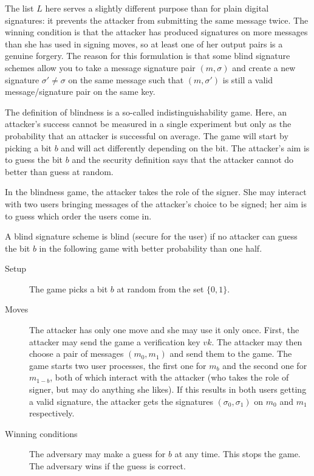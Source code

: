 \documentclass{llncs}
\begin{document}
The list $L$ here serves a slightly different purpose than for plain digital
signatures: it prevents the attacker from submitting the same message twice. The
winning condition is that the attacker has produced signatures on more messages
than she has used in signing moves, so at least one of her output pairs is a
genuine forgery. The reason for this formulation is that some blind signature
schemes allow you to take a message signature pair $(m, \sigma)$ and create a
new signature $\sigma' \neq \sigma$ on the same message such that $(m, \sigma')$
is still a valid message/signature pair on the same key.

The definition of blindness is a so-called indistinguishability game. Here, an
attacker's success cannot be measured in a single experiment but only as the
probability that an attacker is successful on average. The game will start by
picking a bit $b$ and will act differently depending on the bit. The attacker's
aim is to guess the bit $b$ and the security definition says that the attacker
cannot do better than guess at random.

In the blindness game, the attacker takes the role of the signer. She may
interact with two users bringing messages of the attacker's choice to be signed;
her aim is to guess which order the users come in.

\begin{definition}
A blind signature scheme is blind (secure for the user) if no attacker can guess
the bit $b$ in the following game with better probability than one half.

\begin{description}
\item[Setup]
The game picks a bit $b$ at random from the set $\{0, 1\}$.

\item[Moves]
The attacker has only one move and she may use it only once. First, the attacker
may send the game a verification key $vk$. The attacker may then choose a pair
of messages $(m_0, m_1)$ and send them to the game. The game starts two user
processes, the first one for $m_b$ and the second one for $m_{1-b}$, both of
which interact with the attacker (who takes the role of signer, but may do
anything she likes). If this results in both users getting a valid signature,
the attacker gets the signatures $(\sigma_0, \sigma_1)$ on $m_0$ and $m_1$
respectively.

\item[Winning conditions]
The adversary may make a guess for $b$ at any time. This stops the game.
The adversary wins if the guess is correct.
\end{description}
\end{definition}
\end{document}
